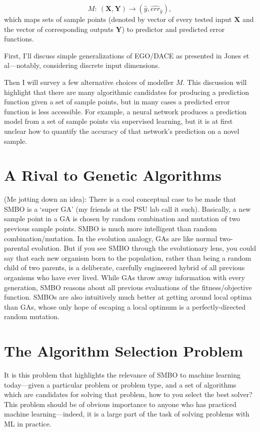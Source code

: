 \begin{equation} \label{eq:modeller}
M:\ (\mathbf{X},\mathbf{Y})\rightarrow (\hat{y},\hat{err}_{\hat{y}}),
\end{equation}
which maps sets of sample points (denoted by vector of every tested input $\mathbf{X}$ and the vector of corresponding outputs $\mathbf{Y}$) to predictor and predicted error functions.

First, I'll discuss simple generalizations of EGO/DACE as presented in Jones et al---notably, considering discrete input dimensions.

Then I will survey a few alternative choices of modeller $M$. This discussion will highlight that there are many algorithmic candidates for producing a prediction function given a set of sample points, but in many cases a predicted error function is less accessible. For example, a neural network produces a prediction model from a set of sample points via supervised learning, but it is at first unclear how to quantify the accuracy of that network's prediction on a novel sample.


\section{A Rival to Genetic Algorithms}

(Me jotting down an idea): There is a cool conceptual case to be made that SMBO is a `super GA' (my friends at the PSU lab call it such). Basically, a new sample point in a GA is chosen by random combination and mutation of two previous sample points. SMBO is much more intelligent than random combination/mutation. In the evolution analogy, GAs are like normal two-parental evolution. But if you see SMBO through the evolutionary lens, you could say that each new organism born to the population, rather than being a random child of two parents, is a deliberate, carefully engineered hybrid of all previous organisms who have ever lived. While GAs throw away information with every generation, SMBO reasons about all previous evaluations of the fitness/objective function. SMBOs are also intuitively much better at getting around local optima than GAs, whose only hope of escaping a local optimum is a perfectly-directed random mutation.


\section{The Algorithm Selection Problem}

It is this problem that highlights the relevance of SMBO to machine learning today---given a particular problem or problem type, and a set of algorithms which are candidates for solving that problem, how to you select the best solver? This problem should be of obvious importance to anyone who has practiced machine learning---indeed, it is a large part of the task of solving problems with ML in practice.


